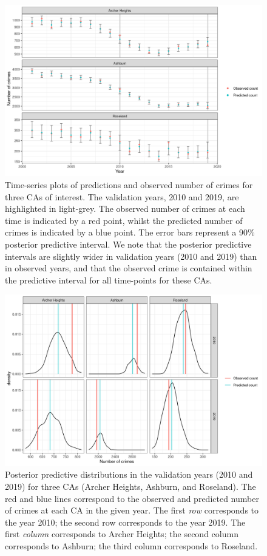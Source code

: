 \documentclass[nojss]{jss}
\begin{document}
\begin{figure}[t!]
    \centering
    \includegraphics[width = \linewidth]{img/Chicago_focused_CAs_time_series.png}
    \caption{Time-series plots of predictions and observed number of crimes for three CAs of interest. The validation years, 2010 and 2019, are highlighted in light-grey. The observed number of crimes at each time is indicated by a red point, whilst the predicted number of crimes is indicated by a blue point. The error bars represent a 90\% posterior predictive interval. We note that the posterior predictive intervals are slightly wider in validation years (2010 and 2019) than in observed years, and that the observed crime is contained within the predictive interval for all time-points for these CAs. 
}   
  \label{fig:chicago_time_series}
\end{figure}

\begin{figure}[t!]
    \centering
    \includegraphics[width = \linewidth]{img/Chicago_focused_CAs_predictive_distributions.png}
    \caption{Posterior predictive distributions in the validation years (2010 and 2019) for three CAs (Archer Heights, Ashburn, and Roseland). The red and blue lines correspond to the observed and predicted number of crimes at each CA in the given year. 
    The first \textit{row} corresponds to the year 2010; the second row corresponds to the year 2019. The first \textit{column} corresponds to Archer Heights; the second column corresponds to Ashburn; the third column corresponds to Roseland. 
}   
  \label{fig:chicago_predictive_distributions}
\end{figure}
\end{document}
